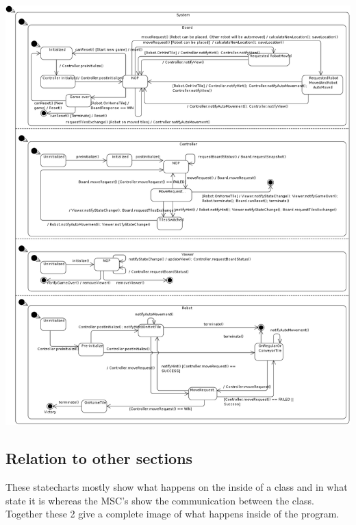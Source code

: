 	\includegraphics[width=\linewidth]{statecharts/system.pdf}

\subsection{Relation to other sections}
    These statecharts mostly show what happens on the inside of a class and in what state it is whereas the MSC's show the communication between the class. Together these 2 give a complete image of what happens inside of the program. 
	
